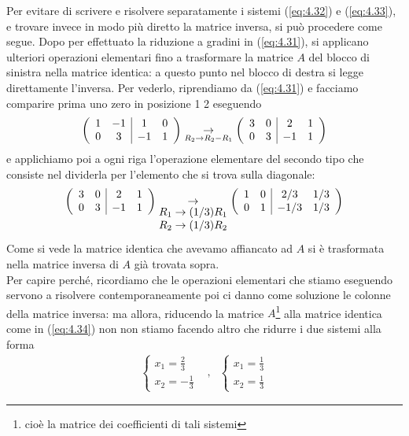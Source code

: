 Per evitare di scrivere e risolvere separatamente i sistemi (\ref{eq:4.32}) e (\ref{eq:4.33}), e trovare invece in
modo più diretto la matrice inversa, si può procedere come segue. Dopo per effettuato la riduzione a gradini in
(\ref{eq:4.31}), si applicano ulteriori operazioni elementari fino a trasformare la matrice $A$ del blocco di
sinistra nella matrice identica: a questo punto nel blocco di destra si legge direttamente l'inversa. Per vederlo,
riprendiamo da (\ref{eq:4.31}) e facciamo comparire prima uno zero in posizione 1 2 eseguendo
\begin{equation*}
  \left(
  \begin{array}{cc|cc}
    1&-1&1&0\\
    0&3&-1&1
  \end{array}\right) \underset{R_2\to R_2-R_1}{\to} \left(
  \begin{array}[center]{cc|cc}
    3 & 0 & 2 &1\\
    0 & 3 & -1 &1
  \end{array}\right)
\end{equation*}
e applichiamo poi a ogni riga l'operazione elementare del secondo tipo che consiste nel dividerla per l'elemento
che si trova sulla diagonale:
\begin{equation}
  \label{eq:4.34}
  \left(
  \begin{array}[center]{cc|cc}
    3 & 0 & 2 &1\\
    0 & 3 & -1 &1
  \end{array}\right)
\underset{
  \begin{matrix}
    R_1\to (1/3) R_1\\ R_2\to(1/3) R_2
  \end{matrix}}{\to}
  \left(
  \begin{array}[center]{cc|cc}
    1 & 0 & 2/3 &1/3\\
    0 & 1 & -1/3 &1/3
  \end{array}\right) 
\end{equation}
Come si vede la matrice identica che avevamo affiancato ad $A$ si è trasformata nella matrice inversa di
$A$ già trovata sopra.\\
Per capire perché, ricordiamo che le operazioni elementari che stiamo eseguendo servono a risolvere
contemporaneamente  poi ci danno come soluzione le colonne della matrice inversa: ma allora, riducendo la matrice
$A$\footnote{cioè la matrice dei coefficienti di tali sistemi} alla matrice identica come in (\ref{eq:4.34}) non
non stiamo facendo altro che ridurre i due sistemi alla forma
\begin{eqnarray*}
  \begin{cases}
    x_1=\frac{2}{3}\\
    x_2=-\frac{1}{3}
  \end{cases}
  &,&
      \begin{cases}
        x_1=\frac{1}{3}\\
        x_2=\frac{1}{3}
      \end{cases}
\end{eqnarray*}

